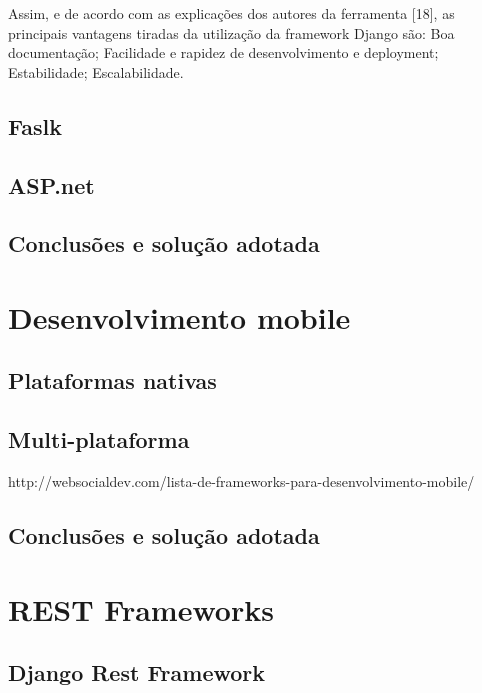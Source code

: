 Assim, e de acordo com as explicações dos autores da ferramenta [18], as
principais vantagens tiradas da utilização da framework Django são:
Boa documentação;
Facilidade e rapidez de desenvolvimento e deployment;
Estabilidade;
Escalabilidade.


\subsection{Faslk}

\subsection{ASP.net}



\subsection{Conclusões e solução adotada}



\newpage
\section{Desenvolvimento mobile}



\subsection{Plataformas nativas}




\subsection{Multi-plataforma}

http://websocialdev.com/lista-de-frameworks-para-desenvolvimento-mobile/


\subsection{Conclusões e solução adotada}





\newpage
\section{REST Frameworks}




\subsection{Django Rest Framework}





